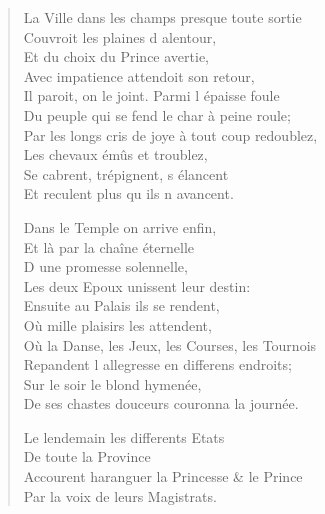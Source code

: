 \begin{verse}
La Ville dans les champs presque toute sortie \\
\vin Couvroit les plaines d\textquotesingle{} alentour, \\
\vin Et du choix du Prince avertie, \\
Avec impatience attendoit son retour, \\
Il paroit, on le joint. Parmi l\textquotesingle{} épaisse foule \\
Du peuple qui se fend le char à peine roule; \\
Par les longs cris de joye à tout coup redoublez, \\
\vin Les chevaux émûs et troublez, \\
\vin Se cabrent, trépignent, s\textquotesingle{} élancent \\
\vin Et reculent plus qu\textquotesingle{} ils n\textquotesingle{} avancent.

\vin Dans le Temple on arrive enfin, \\
\vin Et là par la chaîne éternelle \\
\vin D\textquotesingle{} une promesse solennelle, \\
\vin Les deux Epoux unissent leur destin: \\
\vin Ensuite au Palais ils se rendent, \\
\vin Où mille plaisirs les attendent, \\
Où la Danse, les Jeux, les Courses, les Tournois \\
Repandent l\textquotesingle{} allegresse en differens endroits; \\
\vin Sur le soir le blond hymenée, \\
De ses chastes douceurs couronna la journée.

\vin Le lendemain les differents Etats \\
\vin\vin De toute la Province \\
Accourent haranguer la Princesse \& le Prince \\
\vin Par la voix de leurs Magistrats.


\end{verse}
